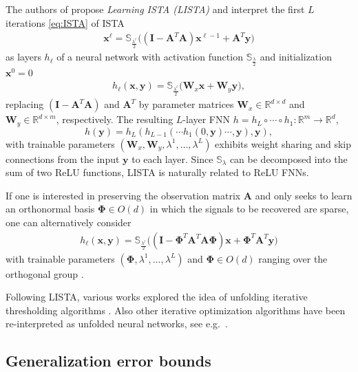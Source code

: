 \documentclass{svproc}
\newcommand{\corr}[1]{#1}
\newcommand{\bA}{\boldsymbol{A}}
\newcommand{\bI}{\boldsymbol{I}}
\newcommand{\bW}{\boldsymbol{W}}
\newcommand{\bx}{\boldsymbol{x}}
\newcommand{\by}{\boldsymbol{y}}
\newcommand{\bPhi}{\boldsymbol{\Phi}}
\newcommand{\0}{\boldsymbol{0}}
\newcommand{\1}{\boldsymbol{1}}
\def\R{\mathbb{R}}
\newcommand{\St}{\mathbb{S}}
\begin{document}
The authors of \cite{gregor2010learning} 
propose \emph{Learning ISTA (LISTA)} and interpret the first $L$ iterations \eqref{eq:ISTA} of ISTA  %
\begin{align*}
    \bx^\ell = \St_{\frac{\lambda^\ell}{2}} \Big( (\bI - \bA^T\bA) \bx^{\ell-1} + \bA^T\by \Big)
\end{align*}
as layers $h_\ell$ of a neural network with activation function $\St_{\frac{\lambda}{2}}$ and initialization $\bx^0 = 0$
\begin{align*}
    h_\ell(\bx,\by) = \St_{\frac{\lambda^\ell}{2}} \Big( \bW_x \bx + \bW_y \by \Big),
\end{align*}
replacing $(\bI - \bA^T\bA)$ and $\bA^T$ by parameter matrices $\bW_x \in \R^{d\times d}$ and $\bW_y \in \R^{d\times m}$, respectively. The resulting $L$-layer FNN $h = h_{L} \circ \cdots \circ h_1 \colon \R^m \to \R^d$,
\[
h(\by) = \corr{h_{L}(h_{L-1}( \cdots h_1(0,\by) \cdots,\by),\by)},
\]
with trainable parameters $(\bW_x,\bW_y,\lambda^1,\hdots,\lambda^L)$ exhibits weight sharing and skip connections from the input $\by$ to each layer. Since $\St_\lambda$ can be decomposed into the sum of two ReLU functions, LISTA is naturally related to ReLU FNNs.

If one is interested in preserving the observation matrix $\bA$ and only seeks to learn an orthonormal basis $\bPhi \in O(d)$ in which the %
signals to be recovered
are sparse, one can alternatively consider
\begin{align}
\label{eq:LISTA_orthogonal}
    h_\ell(\bx,\by) = \St_{\frac{\lambda^\ell}{2}} \Big( (\bI - \bPhi^T\bA^T\bA\bPhi) \bx + \bPhi^T\bA^T\by \Big)
\end{align}
with trainable parameters $(\bPhi,\lambda^1,\hdots,\lambda^L)$ and $\bPhi \in O(d)$ ranging over the orthogonal group \cite{behboodi2022compressive}. 

Following LISTA, various works explored the idea of unfolding iterative thresholding algorithms \cite{wu2020sparse,sun2016deep,liu2019alista,maass2019,behboodi2022compressive,schnoor2023generalization}. Also other iterative optimization algorithms have been re-interpreted as unfolded neural networks, see e.g.\ \cite{ha20,kouni25}.



\subsection{Generalization error bounds}
\end{document}
